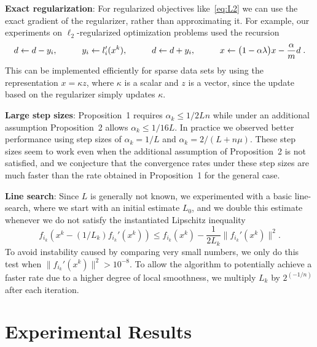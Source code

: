\documentclass{article}
\def\norm#1{\|#1\|}
\begin{document}
\textbf{Exact regularization}: For regularized objectives like~\eqref{eq:L2} we can use the exact gradient of the regularizer, rather than approximating it.  For example, our experiments on $\ell_2$-regularized optimization problems used the recursion
\begin{equation}
\label{eq:L2recursion}
d   \leftarrow d - y_i,  \hspace*{1cm} 
y_i  \leftarrow l_i'(x^k), \hspace*{1cm} 
d  \leftarrow d + y_i, \hspace*{1cm} 
x  \leftarrow \big(1-\alpha\lambda\big)x - \displaystyle \frac{\alpha}{m}d\; .
\end{equation}
This can be implemented efficiently for sparse data sets by using the representation $x = \kappa z$, where $\kappa$ is a scalar and $z$ is a vector, since the update based on the regularizer simply updates $\kappa$.

\textbf{Large step sizes}: Proposition~1 requires $\alpha_k \leqslant 1/2Ln$ while under an additional assumption Proposition~2 allows $\alpha_k \leqslant 1/16L$.  In practice we observed better performance using step sizes of $\alpha_k = 1/L$ and $\alpha_k = 2/(L+n\mu)$. These step sizes seem to work even when the additional assumption of Proposition~2 is not satisfied, and we conjecture that the convergence rates under these step sizes are much faster than the rate obtained in Proposition~1 for the general case.

\textbf{Line search}: Since $L$ is generally not known, we experimented with a basic line-search, where we start with an initial estimate $L_0$, and we double this estimate whenever we do not satisfy the instantiated Lipschitz inequality
\[
f_{i_k}(x^k - (1/L_k)f_{i_k}'(x^k)) \leqslant f_{i_k}(x^k) - \frac{1}{2L_k}\norm{f_{i_k}'(x^k)}^2.
\]
To avoid instability caused by comparing very small numbers, we only do this test when $\norm{f_{i_k}'(x^k)}^2 > 10^{-8}$. To allow the algorithm to potentially achieve a faster rate due to a higher degree of local smoothness, we multiply $L_k$ by $2^{(-1/n)}$ after each iteration.



\section{Experimental Results}
\label{experiments}
\label{sec:experiments}

\end{document}
